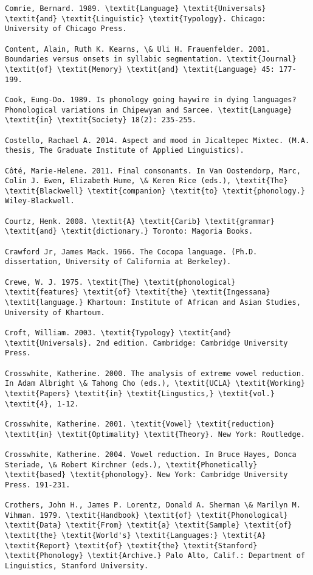\begin{verbatim}
Comrie, Bernard. 1989. \textit{Language} \textit{Universals} \textit{and} \textit{Linguistic} \textit{Typology}. Chicago: University of Chicago Press.

Content, Alain, Ruth K. Kearns, \& Uli H. Frauenfelder. 2001. Boundaries versus onsets in syllabic segmentation. \textit{Journal} \textit{of} \textit{Memory} \textit{and} \textit{Language} 45: 177-199.

Cook, Eung-Do. 1989. Is phonology going haywire in dying languages? Phonological variations in Chipewyan and Sarcee. \textit{Language} \textit{in} \textit{Society} 18(2): 235-255.

Costello, Rachael A. 2014. Aspect and mood in Jicaltepec Mixtec. (M.A. thesis, The Graduate Institute of Applied Linguistics).

Côté, Marie-Helene. 2011. Final consonants. In Van Oostendorp, Marc, Colin J. Ewen, Elizabeth Hume, \& Keren Rice (eds.), \textit{The} \textit{Blackwell} \textit{companion} \textit{to} \textit{phonology.} Wiley-Blackwell.

Courtz, Henk. 2008. \textit{A} \textit{Carib} \textit{grammar} \textit{and} \textit{dictionary.} Toronto: Magoria Books.

Crawford Jr, James Mack. 1966. The Cocopa language. (Ph.D. dissertation, University of California at Berkeley).

Crewe, W. J. 1975. \textit{The} \textit{phonological} \textit{features} \textit{of} \textit{the} \textit{Ingessana} \textit{language.} Khartoum: Institute of African and Asian Studies, University of Khartoum.

Croft, William. 2003. \textit{Typology} \textit{and} \textit{Universals}. 2nd edition. Cambridge: Cambridge University Press.

Crosswhite, Katherine. 2000. The analysis of extreme vowel reduction. In Adam Albright \& Tahong Cho (eds.), \textit{UCLA} \textit{Working} \textit{Papers} \textit{in} \textit{Lingustics,} \textit{vol.} \textit{4}, 1-12.

Crosswhite, Katherine. 2001. \textit{Vowel} \textit{reduction} \textit{in} \textit{Optimality} \textit{Theory}. New York: Routledge.

Crosswhite, Katherine. 2004. Vowel reduction. In Bruce Hayes, Donca Steriade, \& Robert Kirchner (eds.), \textit{Phonetically} \textit{based} \textit{phonology}. New York: Cambridge University Press. 191-231.

Crothers, John H., James P. Lorentz, Donald A. Sherman \& Marilyn M. Vihman. 1979. \textit{Handbook} \textit{of} \textit{Phonological} \textit{Data} \textit{From} \textit{a} \textit{Sample} \textit{of} \textit{the} \textit{World's} \textit{Languages:} \textit{A} \textit{Report} \textit{of} \textit{the} \textit{Stanford} \textit{Phonology} \textit{Archive.} Palo Alto, Calif.: Department of Linguistics, Stanford University.


\end{verbatim}
